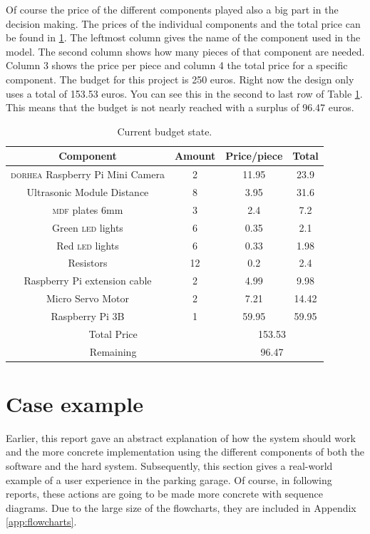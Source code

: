 Of course the price of the different components played also a big part in the decision making. The prices of the individual components and the total price can be found in \ref{tab:budget}. The leftmost column gives the name of the component used in the
model. The second column shows how many pieces of that component are needed. Column 3 shows the price
per piece and column 4 the total price for a specific component.
The budget for this project is 250 euros. Right now the design only uses a total of 153.53 euros. You can see
this in the second to last row of Table \ref{tab:budget}. This means that the budget is not nearly reached with a surplus of
96.47 euros. \newline
\begin{table}[htp]
    \centering
    \caption{Current budget state.}
\begin{tabular}{|c|c|c|c|}
	\hline
	\textbf{Component} & \textbf{Amount} & \textbf{Price/piece} & \textbf{Total} \\
	\hline
	\textsc{dorhea} Raspberry Pi Mini Camera & 2 & 11.95 & 23.9 \\
	\hline
	Ultrasonic Module Distance & 8 & 3.95 & 31.6 \\
	\hline
	\textsc{mdf} plates 6mm & 3 & 2.4 & 7.2 \\
	\hline
	Green \textsc{led} lights & 6 & 0.35 & 2.1 \\
	\hline
	Red \textsc{led} lights & 6 & 0.33 & 1.98 \\
	\hline
	Resistors & 12 & 0.2 & 2.4 \\
	\hline
	Raspberry Pi extension cable & 2 & 4.99 & 9.98 \\
	\hline
	Micro Servo Motor & 2 & 7.21 & 14.42 \\
	\hline
    Raspberry Pi 3B & 1 & 59.95 & 59.95 \\
    \hline
	\multicolumn{2}{|c|}{Total Price} & \multicolumn{2}{c|}{153.53} \\
	\hline
	\multicolumn{2}{|c|}{Remaining} & \multicolumn{2}{c|}{96.47} \\

	\hline
\end{tabular}
        
    \label{tab:budget}
\end{table}
   \newline

\section{Case example}\label{sec:case-example}
Earlier, this report gave an abstract explanation of how the system should work and the more concrete implementation using the different components of both the software and the hard system. Subsequently, this section gives a real-world example of a user experience in the parking garage. Of course, in following reports, these actions are going to be made more concrete with sequence diagrams. Due to the large size of the flowcharts, they are included in Appendix \ref{app:flowcharts}.

